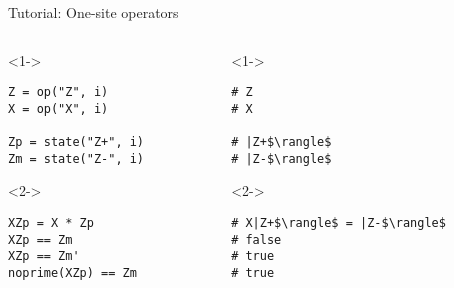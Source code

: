 \begin{frame}[fragile]{Tutorial: One-site operators}

\begin{columns}

\begin{column}{4.5cm}

\begin{onlyenv}<1->

\begin{lstlisting}[language=JuliaLocal, style=julia, basicstyle=\small]
Z = op("Z", i)
X = op("X", i)

Zp = state("Z+", i)
Zm = state("Z-", i)
\end{lstlisting}

\end{onlyenv}

\begin{onlyenv}<2->

\begin{lstlisting}[language=JuliaLocal, style=julia, basicstyle=\small]
XZp = X * Zp
XZp == Zm
XZp == Zm'
noprime(XZp) == Zm
\end{lstlisting}

\end{onlyenv}

\end{column}

\begin{column}{4.5cm}

\begin{onlyenv}<1->

\begin{lstlisting}[style=julia, numbers=none, mathescape, basicstyle=\small]
# Z
# X

# |Z+$\rangle$
# |Z-$\rangle$
\end{lstlisting}

\end{onlyenv}

\begin{onlyenv}<2->

\begin{lstlisting}[style=julia, numbers=none, mathescape, basicstyle=\small]
# X|Z+$\rangle$ = |Z-$\rangle$
# false
# true
# true
\end{lstlisting}

\end{onlyenv}

\end{column}

\end{columns}

\end{frame}
